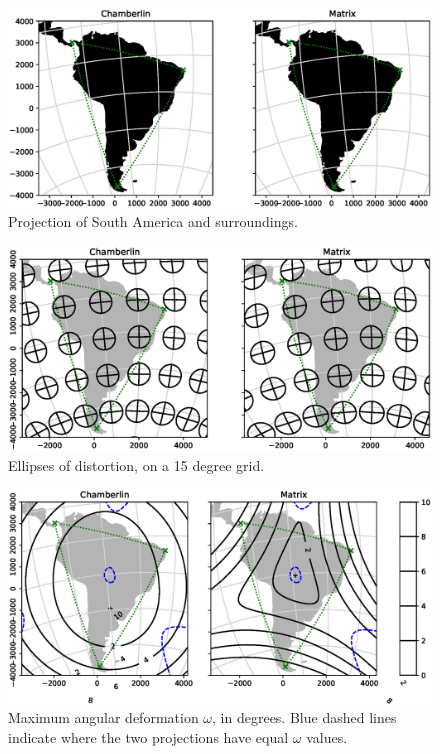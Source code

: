 \documentclass[]{interact}
\begin{document}
\begin{figure}%
  \includegraphics[width=\textwidth]{SA_Wall_Map_zoom}
  \caption{Projection of South America and surroundings.}
  \label{fig:proj}
\end{figure}

\begin{figure}%
  \includegraphics[width=\textwidth]{SA_Wall_Map_tissot}
  \caption{Ellipses of distortion, on a 15 degree grid.}
  \label{fig:tissot}
\end{figure}

\begin{figure}%
  \includegraphics[width=\textwidth]{SA_Wall_Map_omega}
  \caption{Maximum angular deformation $\omega$, in degrees. Blue dashed lines
  indicate where the two projections have equal $\omega$ values.}
  \label{fig:angle}
\end{figure}
\end{document}
